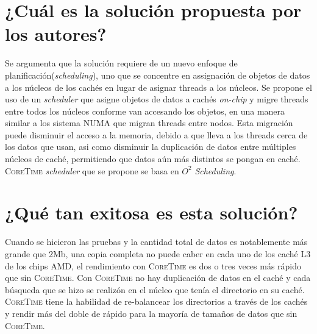 \section{¿Cuál es la solución propuesta por los autores?}
Se argumenta que la solución requiere de un nuevo enfoque de planificación(\emph{scheduling}), uno que se concentre en assignación de objetos de datos a los núcleos de los cachés en lugar de asignar threads a los núcleos. Se propone el uso de un \emph{scheduler} que asigne objetos de datos a cachés \emph{on-chip} y migre threads entre todos los núcleos conforme van accesando los objetos, en una manera similar a los sistema NUMA que migran threads entre nodos. Esta migración puede disminuir el acceso a la memoria, debido a que lleva a los threads cerca de los datos que usan, asi como disminuir la duplicación de datos entre múltiples núcleos de caché, permitiendo que datos aún más distintos se pongan en caché. \textsc{CoreTime} \emph{scheduler} que se propone se basa en $O^2$ \emph{Scheduling}.

\section{¿Qué tan exitosa es esta solución?}
Cuando se hicieron las pruebas y la cantidad total de datos es notablemente más grande que 2Mb, una copia completa no puede caber en cada uno de los caché L3 de los chips AMD, el rendimiento con \textsc{CoreTime} es dos o tres veces más rápido que sin \textsc{CoreTime}. Con \textsc{CoreTime} no hay duplicación de datos en el caché y cada búsqueda que se hizo se realizón en el núcleo que tenía el directorio en su caché. \textsc{CoreTime} tiene la habilidad de re-balancear los directorios a través de los cachés y rendir más del doble de rápido para la mayoría de tamaños de datos que sin \textsc{CoreTime}.










































 